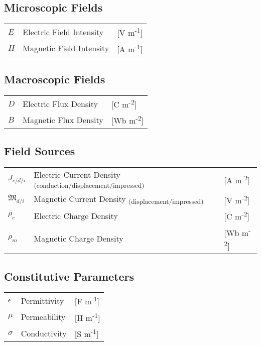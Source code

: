 \documentclass{article}
\numberwithin{equation}{section}
\begin{document}
        \subsection*{Microscopic Fields}
            \begin{tabular}{ m{7em} m{24em} m{4em} }
                \( E \) & Electric Field Intensity & [V m\textsuperscript{-1}] \\
                \( H \) & Magnetic Field Intensity & [A m\textsuperscript{-1}] \\
            \end{tabular}
        \subsection*{Macroscopic Fields}
            \begin{tabular}{ m{7em} m{24em} m{4em} }
                \( D \) & Electric Flux Density & [C m\textsuperscript{-2}] \\
                \( B \) & Magnetic Flux Density & [Wb m\textsuperscript{-2}] \\
            \end{tabular}
        \subsection*{Field Sources}
            \begin{tabular}{ m{7em} m{24em} m{4em} }
                \( \displaystyle J_{c/d/i} \) & Electric Current Density 
                    \textsubscript{(conduction/displacement/impressed)} &
                    [A m\textsuperscript{-2}] \\
                \( \displaystyle \mathfrak{M}_{d/i} \) & Magnetic Current Density 
                    \textsubscript{(displacement/impressed)} & [V m\textsuperscript{-2}]
                    \\
                \( \displaystyle \rho_{e} \) & Electric Charge Density & 
                    [C m\textsuperscript{-2}] \\
                \( \displaystyle \rho_{m} \) & Magnetic Charge Density & 
                [Wb m\textsuperscript{-2}]
            \end{tabular}
        \subsection*{Constitutive Parameters}
            \begin{tabular}{ m{7em} m{24em} m{4em} }
                \( \displaystyle \epsilon \) & Permittivity & [F m\textsuperscript{-1}] \\
                \( \displaystyle \mu \) & Permeability & [H m\textsuperscript{-1}] \\
                \( \displaystyle \sigma \) & Conductivity & [S m\textsuperscript{-1}] \\
            \end{tabular}
\end{document}
